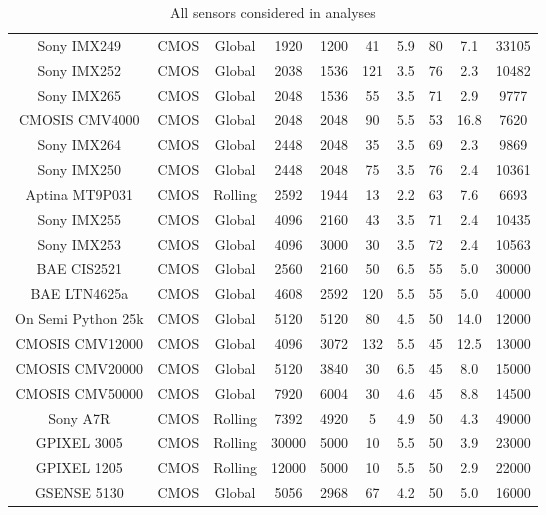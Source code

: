 \begin{table}[t]
{\begin{tabular}{cccccccccc}
Sony IMX249 & CMOS & Global & 1920 & 1200 & 41 & 5.9 & 80 & 7.1 & 33105\\ 
Sony IMX252 & CMOS & Global & 2038 & 1536 & 121 & 3.5 & 76 & 2.3 & 10482\\ 
Sony IMX265 & CMOS & Global & 2048 & 1536 & 55 & 3.5 & 71 & 2.9 & 9777\\ 
CMOSIS CMV4000 & CMOS & Global & 2048 & 2048 & 90 & 5.5 & 53 & 16.8 & 7620\\ 
Sony IMX264 & CMOS & Global & 2448 & 2048 & 35 & 3.5 & 69 & 2.3 & 9869\\ 
Sony IMX250 & CMOS & Global & 2448 & 2048 & 75 & 3.5 & 76 & 2.4 & 10361\\ 
Aptina MT9P031 & CMOS & Rolling & 2592 & 1944 & 13 & 2.2 & 63 & 7.6 & 6693\\ 
Sony IMX255 & CMOS & Global & 4096 & 2160 & 43 & 3.5 & 71 & 2.4 & 10435\\ 
Sony IMX253 & CMOS & Global & 4096 & 3000 & 30 & 3.5 & 72 & 2.4 & 10563\\ 
BAE CIS2521 & CMOS & Global & 2560 & 2160 & 50 & 6.5 & 55 & 5.0 & 30000\\ 
BAE LTN4625a & CMOS & Global & 4608 & 2592 & 120 & 5.5 & 55 & 5.0 & 40000\\ 
On Semi Python 25k & CMOS & Global & 5120 & 5120 & 80 & 4.5 & 50 & 14.0 & 12000\\ 
CMOSIS CMV12000 & CMOS & Global & 4096 & 3072 & 132 & 5.5 & 45 & 12.5 & 13000\\ 
CMOSIS CMV20000 & CMOS & Global & 5120 & 3840 & 30 & 6.5 & 45 & 8.0 & 15000\\ 
CMOSIS CMV50000 & CMOS & Global & 7920 & 6004 & 30 & 4.6 & 45 & 8.8 & 14500\\ 
Sony A7R & CMOS & Rolling & 7392 & 4920 & 5 & 4.9 & 50 & 4.3 & 49000\\ 
GPIXEL 3005 & CMOS & Rolling & 30000 & 5000 & 10 & 5.5 & 50 & 3.9 & 23000\\ 
GPIXEL 1205 & CMOS & Rolling & 12000 & 5000 & 10 & 5.5 & 50 & 2.9 & 22000\\ 
GSENSE 5130 & CMOS & Global & 5056 & 2968 & 67 & 4.2 & 50 & 5.0 & 16000\\ 

\end{tabular}%
}
\caption{All sensors considered in analyses}
\label{table:all_sensors}
\end{table}
